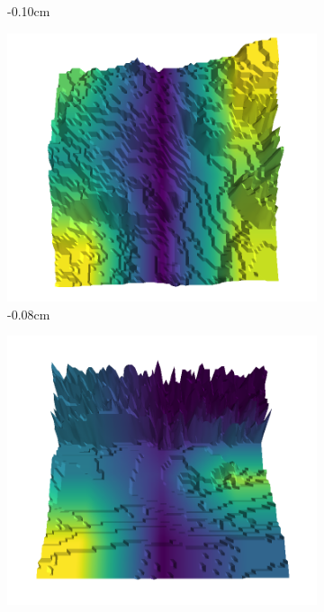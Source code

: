 \documentclass[../document.tex]{subfiles}
\begin{document}
\begin{figure}[H]
\begin{subfigure}[b]{0.242\linewidth}
        \caption{-0.10cm}
        \end{subfigure}
        \begin{subfigure}[b]{0.242\linewidth}
        \includegraphics[width=\linewidth]{../img/5/quarry/false_negative/-4-patch-3d-majavi-colormap-10.png}
        \caption{-0.08cm}
        \end{subfigure}
        \begin{subfigure}[b]{0.242\linewidth}
        \includegraphics[width=\linewidth]{../img/5/quarry/false_negative/-1-patch-3d-majavi-colormap-15.png}

\end{subfigure}
\end{figure}
\end{document}
